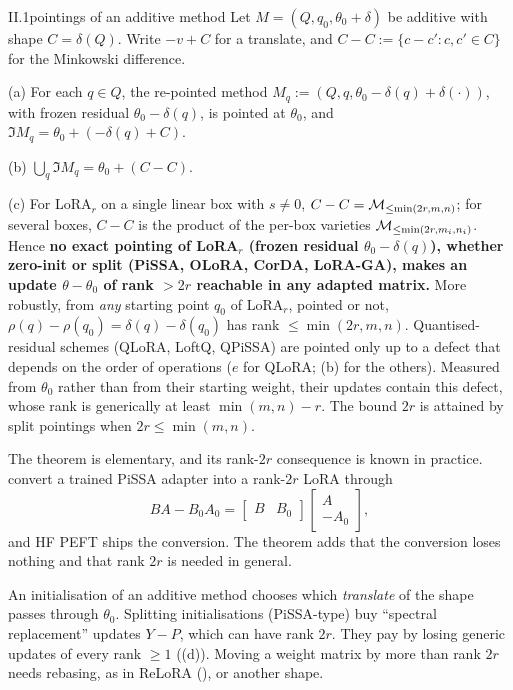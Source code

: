 \begin{theorem}{II.1}{pointings of an additive method}
Let $M=(Q,q_0,\theta_0+\delta)$ be additive with shape $C=\delta(Q)$. Write $-v+C$ for a translate, and
$C-C:=\{c-c':c,c'\in C\}$ for the Minkowski difference.

(a) For each $q\in Q$, the re-pointed method $M_q:=(Q,q,\theta_0-\delta(q)+\delta(\cdot))$, with frozen residual
$\theta_0-\delta(q)$, is pointed at $\theta_0$, and $\Im M_q=\theta_0+(-\delta(q)+C)$.

(b) $\bigcup_q\Im M_q=\theta_0+(C-C)$.

(c) For LoRA$_r$ on a single linear box with $s\ne0$, $C-C=\mathcal{M}_{\le\min(2r,m,n)}$; for several boxes, $C-C$ is the
product of the per-box varieties $\mathcal{M}_{\le\min(2r,m_i,n_i)}$. Hence \textbf{no exact pointing of LoRA$_r$ (frozen
residual $\theta_0-\delta(q)$), whether zero-init or split (PiSSA, OLoRA, CorDA, LoRA-GA), makes an update
$\theta-\theta_0$ of rank $>2r$ reachable in any adapted matrix.} More robustly, from \emph{any} starting point $q_0$ of
LoRA$_r$, pointed or not, $\rho(q)-\rho(q_0)=\delta(q)-\delta(q_0)$ has rank $\le\min(2r,m,n)$. Quantised-residual
schemes (QLoRA, LoftQ, QPiSSA) are pointed only up to a defect that depends on the order of operations ($e$ for QLoRA;
(b) for the others). Measured from $\theta_0$ rather than from their starting weight, their
updates contain this defect, whose rank is generically at least $\min(m,n)-r$. The bound $2r$ is attained by split
pointings when $2r\le\min(m,n)$.
\end{theorem}

The theorem is elementary, and its rank-$2r$ consequence is known in practice. \citet{meng2024pissa} convert a trained
PiSSA adapter into a rank-$2r$ LoRA through
\begin{equation}\label{eq:pissa-to-lora}
  BA-B_0A_0=\begin{bmatrix}B & B_0\end{bmatrix}\begin{bmatrix}A\\ -A_0\end{bmatrix},
\end{equation}
and HF PEFT ships the conversion. The theorem adds that the conversion loses nothing and that rank $2r$ is needed in
general.

\begin{explains}
An initialisation of an additive method chooses which \emph{translate} of the shape passes through $\theta_0$.
Splitting initialisations (PiSSA-type) buy ``spectral replacement'' updates $Y-P$, which can have rank $2r$. They pay by
losing generic updates of every rank $\ge1$ ((d)). Moving a weight matrix by more than rank $2r$
needs rebasing, as in ReLoRA \citep{lialin2023relora} (), or another shape.
\end{explains}

